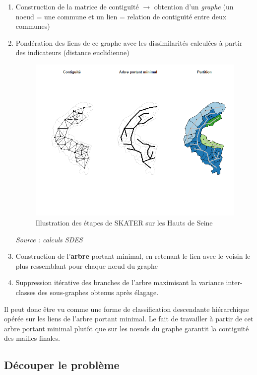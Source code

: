 \documentclass[12pt, a4paper]{article}
\begin{document}
\begin{enumerate}
\item Construction de la matrice de contiguïté $\rightarrow$ obtention d'un \emph{graphe} (un noeud = une commune et un lien = relation de contiguïté entre deux communes)
\item Pondération des liens de ce graphe avec les dissimilarités calculées à partir des indicateurs (distance euclidienne)

\begin{figure}[H]
\caption{Illustration des étapes de SKATER sur les Hauts de Seine}
\begin{center}
\includegraphics[scale=.7]{img/SKATER.png}
\end{center}
\end{figure}
\emph{Source : calculs SDES}

\item Construction de l'\textbf{arbre} portant minimal, en retenant le lien avec le voisin le plus ressemblant pour chaque n\oe ud du graphe
\item Suppression itérative des branches de l'arbre maximisant la variance inter-classes des sous-graphes obtenus après élagage.
\end{enumerate}

Il peut donc être vu comme une forme de classification descendante hiérarchique opérée sur les liens de l'arbre portant minimal. Le fait de travailler à partir de cet arbre portant minimal plutôt que sur les n\oe uds du graphe garantit la contiguïté des mailles finales.


\subsection{Découper le problème}
\end{document}
